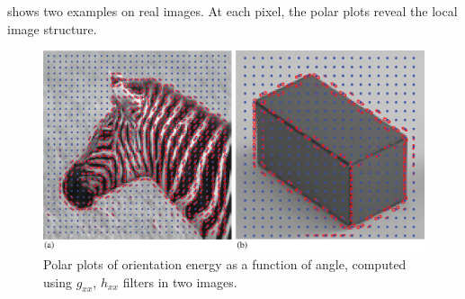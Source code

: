 \Fig{\ref{fig:multioriflorets_examples}} shows two examples on real images. At each pixel, the polar plots reveal the local image structure.


\begin{figure}[t]
	\centerline{
		\includegraphics[width=1\linewidth]{figures/spatial_filter_sets/steer_quad_polarplot_zebra_cube.eps}
	}
	\caption{Polar plots of orientation energy as a
		function of angle, computed using $g_{xx}$, $h_{xx}$ filters in two images.}
	\label{fig:multioriflorets_examples}
\end{figure}




